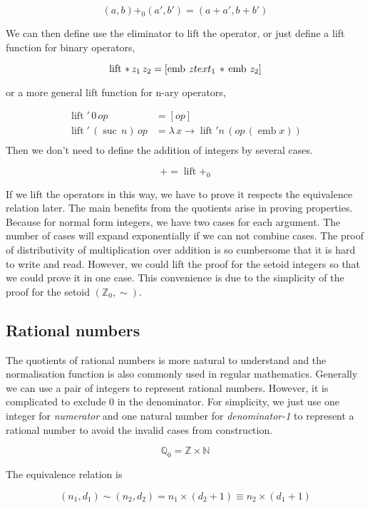 \documentclass[envcountsame]{llncs}
\newcommand{\N}{\mathbb{N}}
\newcommand{\Q}{\mathbb{Q}}
\newcommand{\Z}{\mathbb{Z}}
\providecommand{\class}[1]{[#1]}
\DeclareMathOperator{\emb}{emb}
\DeclareMathOperator{\lift}{lift}
\DeclareMathOperator{\suc}{suc\,}
\begin{document}
$$(a,b){+_0}(a', b')= (a+a',b+b')$$

We can then define use the eliminator to lift the operator, or just define a lift function for binary operators,

$$ \lift \,* \,z_1 \,z_2 = \class{\emb \,z\textcolor[rgb]{0,0,0}{text}_1 \,*\,\emb \,z_2}$$

or a more general lift function for n-ary operators,



\begin{align*}
\lift' \,0 \,op &= \class{op}\\
\lift' \,(\suc n) \,op &= \lambda \,x \to \lift' n \,(op \,(\emb x))\\
\end{align*}
Then we don't need to define the addition of integers by several cases.

$$+ = \lift +_0$$

If we lift the operators in this way, we have to prove it respects the equivalence relation later. The main benefits from the quotients arise in proving properties. Because for normal form integers, we have two cases for each argument. The number of cases will expand exponentially if we can not combine cases. The proof of distributivity of multiplication over addition is so cumbersome
that it is hard to write and read. However, we could lift the proof for the setoid integers so that we could prove it in one case. This convenience is due to the simplicity of the proof for the setoid $(\Z_0,\sim)$. 

\subsection{Rational numbers}

The quotients of rational numbers is more natural to understand and the normalisation function is also commonly used in regular mathematics. Generally we can use a pair of integers to represent rational numbers. However, it is complicated to exclude 0 in the denominator. For simplicity, we just use one integer for \emph{numerator} and one natural number for \emph{denominator-1} to represent a rational number to avoid the invalid cases from construction. 

$$\Q_0 = \Z \times \N$$



The equivalence relation is

$$(n_1, d_1) \sim (n_2, d_2) = n_1 \times (d_2 + 1) \equiv n_2 \times (d_1 + 1) $$
\end{document}
